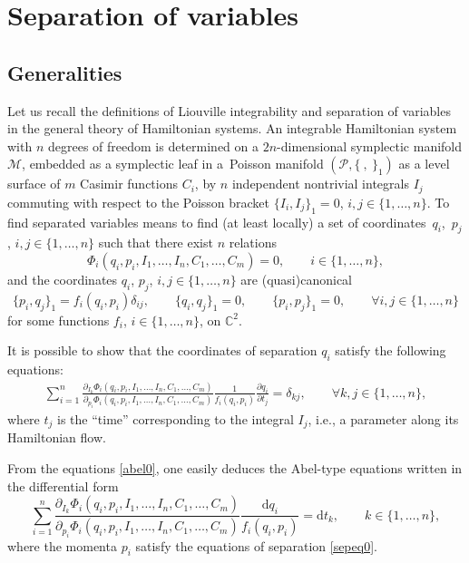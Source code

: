 \documentclass[10pt,a4paper]{amsart}
\def\d{\delta}
\numberwithin{equation}{section}
\begin{document}
\section{Separation of variables}\label{sec2}

\subsection{Generalities}\label{general}
Let us recall the definitions of Liouville integrability and
separation of variables in the general theory of Hamiltonian
systems. An integrable Hamiltonian system with $n$ degrees of
freedom is determined on a $2n$-dimensional symplectic manifold
$\mathcal{M}$, embedded as a symplectic leaf in a~Poisson
manifold $(\mathcal{P},\{\ ,\ \}_1)$ as a level surface of $m$
Casimir functions $C_i$, by $n$ independent nontrivial integrals
$I_j$ commuting with respect to the Poisson bracket
$
\{I_i ,I_j\}_1 = 0$, $ i,j \in \{1, \dots, n\}$.
 To find separated variables means to find (at least locally) a set of coordinates~$q_i$,~$p_j$, $i,j \in
\{1, \dots, n\}$ such that there exist $n$ relations
\begin{equation}\label{sepeq0}
 \Phi_i(q_i, p_i,I_1, \dots ,I_n, C_1, \dots ,C_m) = 0, \qquad i\in \{1, \dots, n\},
\end{equation}
and the coordinates $q_i$, $p_j$, $i,j \in \{1, \dots, n\}$ are (quasi)canonical
\[
\{ p_i, q_j \}_1= f_i(q_i,p_i) \d_{ij}, \qquad \{q_i,q_j\}_1=0,\qquad
\{p_i,p_j\}_1=0, \qquad \forall i,j \in \{1, \dots, n\}
\]
for some functions $f_i$, $i\in \{1, \dots, n\}$, on $\mathbb{C}^2$.

It is possible to show \cite{SkrJMP2021}
 that the coordinates of separation $q_i$
 satisfy the following equations:
\begin{gather}\label{abel0}
\sum\limits_{i=1}^n \frac{ {\partial_{I_k} \Phi_i(q_i, p_i, I_1,\dots ,I_n, C_1, \dots ,C_m)} }{ {\partial_{p_i} \Phi_i(q_i, p_i ,I_1, \dots ,I_n, C_1, \dots ,C_m)}}\frac{1}{ f_i(q_i,p_i)} \frac{\partial q_i}{\partial t_j} = \d_{kj}, \qquad \forall k,j\in \{1, \dots, n\},
\end{gather}
where $t_j$ is the ``time'' corresponding to the integral $I_j$, i.e., a parameter along its Hamiltonian flow.

From the equations \eqref{abel0}, one easily deduces the Abel-type equations written in the differential form
\begin{equation}\label{abel0'}
\sum\limits_{i=1}^n \frac{ {\partial_{I_k} \Phi_i(q_i, p_i, I_1, \dots ,I_n, C_1, \dots ,C_m)} }{ {\partial_{p_i} \Phi_i(q_i, p_i ,I_1, \dots ,I_n, C_1, \dots ,C_m)}} \frac{\mathrm{d} q_i}{ f_i(q_i,p_i)} = \mathrm{d} t_k, \qquad k\in \{1, \dots, n\},
\end{equation}
where the momenta $p_i$ satisfy the equations of separation \eqref{sepeq0}.
\end{document}
